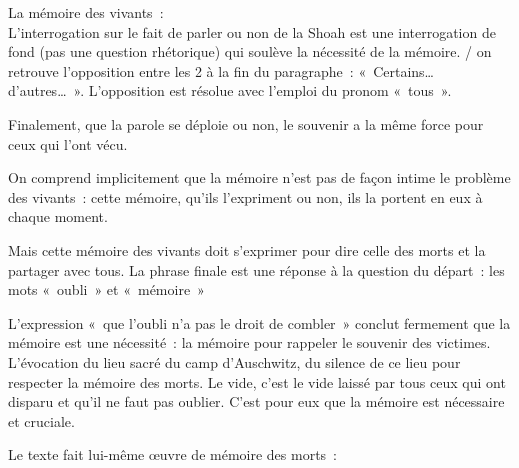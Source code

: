 {La mémoire des vivants~:\hfill{~}\\
L'interrogation sur le fait de parler ou non de la Shoah est une interrogation de fond (pas une
question rhétorique) qui soulève la nécessité de la mémoire. / on retrouve l'opposition entre les 2 à la fin du paragraphe~: «~Certains… d'autres…~». L'opposition est résolue avec l'emploi du
pronom «~tous~».

Finalement, que la parole se déploie ou non, le souvenir a la même force pour ceux qui l'ont vécu.

On comprend implicitement que la mémoire n'est pas de façon intime le problème des vivants~:
cette mémoire, qu'ils l'expriment ou non, ils la portent en eux à chaque moment.

Mais cette mémoire des vivants doit s'exprimer pour dire celle des morts et la partager avec tous.
La phrase finale est une réponse à la question du départ~: les mots «~oubli~» et «~mémoire~»

L'expression «~que l'oubli n'a pas le droit de combler~» conclut fermement que la mémoire est
une nécessité~: la mémoire pour rappeler le souvenir des victimes. L'évocation du lieu sacré du
camp d'Auschwitz, du silence de ce lieu pour respecter la mémoire des morts. Le vide, c'est le
vide laissé par tous ceux qui ont disparu et qu'il ne faut pas oublier. C'est pour eux que la mémoire
est nécessaire et cruciale.

Le texte fait lui-même œuvre de mémoire des morts~:

}
